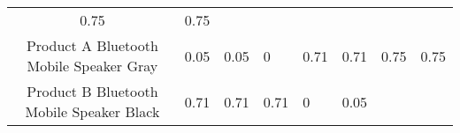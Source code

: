\documentclass[]{article}
\begin{document}
\begin{longtable}[]{@{}ccllllll@{}}
\begin{minipage}[t]{0.05\columnwidth}
0.75\strut
\end{minipage} & \begin{minipage}[t]{0.05\columnwidth}\raggedright\strut
0.75\strut
\end{minipage}\tabularnewline
\begin{minipage}[t]{0.36\columnwidth}\centering\strut
Product A Bluetooth Mobile Speaker Gray\strut
\end{minipage} & \begin{minipage}[t]{0.05\columnwidth}\centering\strut
0.05\strut
\end{minipage} & \begin{minipage}[t]{0.05\columnwidth}\raggedright\strut
0.05\strut
\end{minipage} & \begin{minipage}[t]{0.05\columnwidth}\raggedright\strut
0\strut
\end{minipage} & \begin{minipage}[t]{0.05\columnwidth}\raggedright\strut
0.71\strut
\end{minipage} & \begin{minipage}[t]{0.05\columnwidth}\raggedright\strut
0.71\strut
\end{minipage} & \begin{minipage}[t]{0.05\columnwidth}\raggedright\strut
0.75\strut
\end{minipage} & \begin{minipage}[t]{0.05\columnwidth}\raggedright\strut
0.75\strut
\end{minipage}\tabularnewline
\begin{minipage}[t]{0.36\columnwidth}\centering\strut
Product B Bluetooth Mobile Speaker Black\strut
\end{minipage} & \begin{minipage}[t]{0.05\columnwidth}\centering\strut
0.71\strut
\end{minipage} & \begin{minipage}[t]{0.05\columnwidth}\raggedright\strut
0.71\strut
\end{minipage} & \begin{minipage}[t]{0.05\columnwidth}\raggedright\strut
0.71\strut
\end{minipage} & \begin{minipage}[t]{0.05\columnwidth}\raggedright\strut
0\strut
\end{minipage} & \begin{minipage}[t]{0.05\columnwidth}\raggedright\strut
0.05\strut
\end{minipage} & \begin{minipage}[t]{0.05\columnwidth}\raggedright\strut

\end{minipage}
\end{longtable}
\end{document}
